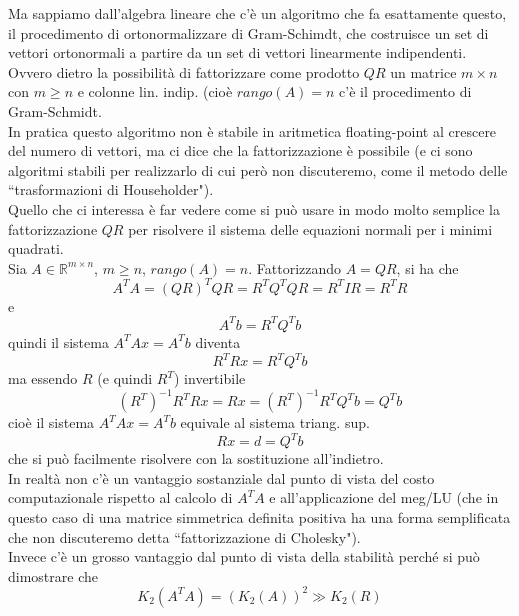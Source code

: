 \documentclass[12pt,a4paper]{article}
\begin{document}
Ma sappiamo dall'algebra lineare che c'è un algoritmo che fa esattamente questo, il procedimento di ortonormalizzare di Gram-Schimdt, che costruisce un set di vettori ortonormali a partire da un set di vettori linearmente indipendenti.\\
Ovvero dietro la possibilità di fattorizzare come prodotto $QR$ un matrice $m\times n$ con $m\geq n$ e colonne lin. indip. (cioè $rango(A)=n$ c'è il procedimento di Gram-Schmidt. \\
In pratica questo algoritmo non è stabile in aritmetica floating-point al crescere del numero di vettori, ma ci dice che la fattorizzazione è possibile (e ci sono algoritmi stabili per realizzarlo di cui però non discuteremo, come il metodo delle ``trasformazioni di Householder").\\
Quello che ci interessa è far vedere come si può usare in modo molto semplice la fattorizzazione $QR$ per risolvere il sistema delle equazioni normali per i minimi quadrati. \\
Sia $A\in \mathbb{R}^{m\times n}$, $m\geq n$, $rango(A)=n$. Fattorizzando $A=QR$, si ha che
\begin{equation*}
    A^TA=(QR)^TQR=R^TQ^TQR=R^TIR=R^TR
\end{equation*}
e
\begin{equation*}
    A^Tb=R^TQ^Tb
\end{equation*}
quindi il sistema $A^TAx=A^Tb$ diventa 
\begin{equation*}
    R^TRx=R^TQ^Tb
\end{equation*}
ma essendo $R$ (e quindi $R^T$) invertibile
\begin{equation*}
    (R^T)^{-1}R^TRx=Rx=(R^T)^{-1}R^TQ^Tb=Q^Tb
\end{equation*}
cioè il sistema $A^TAx=A^Tb$ equivale al sistema triang. sup.
\begin{equation*}
    Rx=d=Q^Tb
\end{equation*}
che si può facilmente risolvere con la sostituzione all'indietro. \\
In realtà non c'è un vantaggio sostanziale dal punto di vista del costo computazionale rispetto al calcolo di $A^TA$ e all'applicazione del meg/LU (che in questo caso di una matrice simmetrica definita positiva ha una forma semplificata che non discuteremo detta ``fattorizzazione di Cholesky"). \\
Invece c'è un grosso vantaggio dal punto di vista della stabilità perché si può dimostrare che
\begin{equation*}
    K_2(A^TA)=(K_2(A))^2 \gg K_2(R)
\end{equation*}
\end{document}
